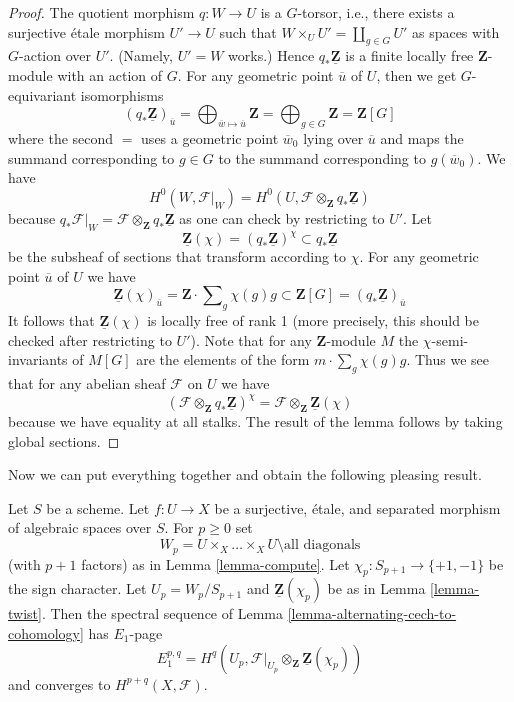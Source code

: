 \begin{proof}
The quotient morphism $q : W \to U$ is a $G$-torsor, i.e., there exists
a surjective \'etale morphism $U' \to U$ such that
$W \times_U U' = \coprod_{g \in G} U'$ as spaces with $G$-action over $U'$.
(Namely, $U' = W$ works.) Hence $q_*\underline{\mathbf{Z}}$ is a finite
locally free $\mathbf{Z}$-module with an action of $G$. For any
geometric point $\overline{u}$ of $U$, then we get $G$-equivariant
isomorphisms
$$
(q_*\underline{\mathbf{Z}})_{\overline{u}}
= \bigoplus\nolimits_{\overline{w} \mapsto \overline{u}} \mathbf{Z}
= \bigoplus\nolimits_{g \in G} \mathbf{Z} = \mathbf{Z}[G]
$$
where the second $=$ uses a geometric point
$\overline{w}_0$ lying over $\overline{u}$ and
maps the summand corresponding to $g \in G$ to the summand
corresponding to $g(\overline{w}_0)$. We have
$$
H^0(W, \mathcal{F}|_W) =
H^0(U, \mathcal{F} \otimes_\mathbf{Z} q_*\underline{\mathbf{Z}})
$$
because
$q_*\mathcal{F}|_W = \mathcal{F} \otimes_\mathbf{Z} q_*\underline{\mathbf{Z}}$
as one can check by restricting to $U'$. Let
$$
\underline{\mathbf{Z}}(\chi) =
(q_*\underline{\mathbf{Z}})^\chi \subset
q_*\underline{\mathbf{Z}}
$$
be the subsheaf of sections that transform according to $\chi$. For
any geometric point $\overline{u}$ of $U$ we have
$$
\underline{\mathbf{Z}}(\chi)_{\overline{u}} =
\mathbf{Z} \cdot \sum\nolimits_g \chi(g) g
\subset
\mathbf{Z}[G] = (q_*\underline{\mathbf{Z}})_{\overline{u}}
$$
It follows that $\underline{\mathbf{Z}}(\chi)$ is locally free of
rank 1 (more precisely, this should be checked after restricting to $U'$).
Note that for any $\mathbf{Z}$-module $M$ the $\chi$-semi-invariants
of $M[G]$ are the elements of the form $m \cdot \sum\nolimits_g \chi(g) g$.
Thus we see that for any abelian sheaf $\mathcal{F}$ on $U$ we have
$$
\left(\mathcal{F} \otimes_\mathbf{Z} q_*\underline{\mathbf{Z}}\right)^\chi
=
\mathcal{F} \otimes_\mathbf{Z} \underline{\mathbf{Z}}(\chi)
$$
because we have equality at all stalks. The result of the lemma follows by
taking global sections.
\end{proof}

\noindent
Now we can put everything together and obtain the following
pleasing result.

\begin{lemma}
\label{lemma-alternating-spectral-sequence}
Let $S$ be a scheme. Let $f : U \to X$ be a surjective, \'etale, and
separated morphism of algebraic spaces over $S$. For $p \geq 0$ set
$$
W_p = U \times_X \ldots \times_X U \setminus \text{all diagonals}
$$
(with $p + 1$ factors) as in Lemma \ref{lemma-compute}.
Let $\chi_p : S_{p + 1} \to \{+1, -1\}$ be the sign character.
Let $U_p = W_p/S_{p + 1}$ and $\underline{\mathbf{Z}}(\chi_p)$ be as in
Lemma \ref{lemma-twist}.
Then the spectral sequence of
Lemma \ref{lemma-alternating-cech-to-cohomology}
has $E_1$-page
$$
E_1^{p, q} =
H^q(U_p, \mathcal{F}|_{U_p} \otimes_\mathbf{Z} \underline{\mathbf{Z}}(\chi_p))
$$
and converges to $H^{p + q}(X, \mathcal{F})$.
\end{lemma}

